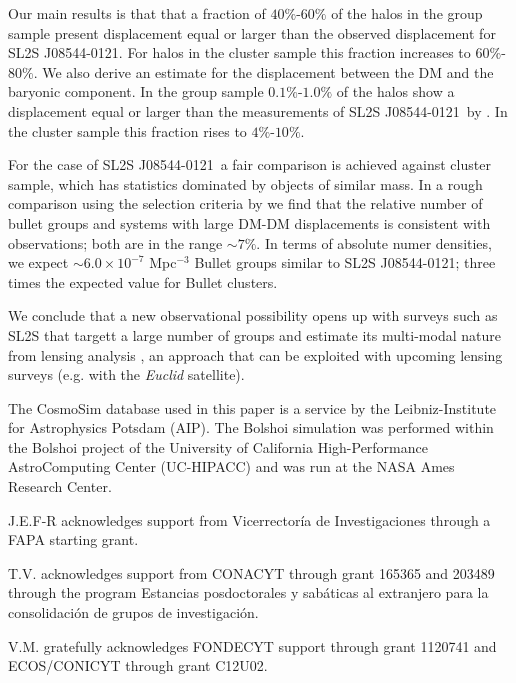 \documentclass{emulateapj}
\newcommand{\bullg}{SL2S J08544-0121}
\begin{document}
Our main results is that that a fraction of $40\%$-$60\%$ of the halos
in the group sample present displacement equal or larger than the
observed displacement for \bullg. For halos in the cluster sample this
fraction increases to $60\%$-$80\%$. We also derive an
estimate for the displacement between the DM and the baryonic
component. In the group sample $0.1\%$-$1.0\%$ of the halos show a
displacement equal or larger than  the  measurements of \bullg\ by
\citep{Gastaldello}. In the cluster sample this fraction rises to
$4\%$-$10\%$. 


For the case of \bullg\ a fair comparison is achieved against cluster
sample, which has statistics dominated by objects of similar mass. In
a rough comparison using the selection criteria by \citep{Gael2013,
  Gastaldello} we find that the relative number of bullet groups and
systems with large DM-DM displacements is consistent with
observations; both are in the range $\sim 7\%$. In terms of absolute
numer densities, we expect $\sim 6.0\times 10^{-7}$ Mpc$^{-3}$ Bullet
groups similar to \bullg; three times the expected value for Bullet
clusters. 

We conclude that a new observational possibility opens up with surveys
such as SL2S that targett a large number of groups and estimate its
multi-modal nature from lensing analysis \citep{Foex2013}, an approach
that can be exploited with upcoming lensing surveys (e.g. with the
{\it Euclid} satellite). 

The CosmoSim database used in this paper is a service by the
Leibniz-Institute for Astrophysics Potsdam (AIP). The  Bolshoi
simulation was performed within the Bolshoi project of the University
of California High-Performance AstroComputing Center (UC-HIPACC) and
was run at the NASA Ames Research Center. 

J.E.F-R acknowledges support from Vicerrector\'ia de
Investigaciones through a FAPA starting grant.

T.V. acknowledges support from CONACYT through grant 165365 and
203489 through the program Estancias posdoctorales y sab\'aticas al
extranjero para la consolidaci\'on de grupos de investigaci\'on.  

V.M. gratefully acknowledges FONDECYT support through grant 1120741
and ECOS/CONICYT through grant C12U02. 


 
\end{document}
